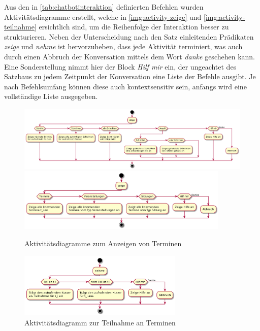 Aus den in \autoref{tab:chatbotinteraktion} definierten Befehlen wurden Aktivitätsdiagramme erstellt, welche in \autoref{img:activity-zeige} und \autoref{img:activity-teilnahme} ersichtlich sind, um die Reihenfolge der Interaktion besser zu strukturieren.
Neben der Unterscheidung nach den Satz einleitenden Prädikaten \textit{zeige} und \textit{nehme} ist hervorzuheben, dass jede Aktivität terminiert, was auch durch einen Abbruch der Konversation mittels dem Wort \textit{danke} geschehen kann. Eine Sonderstellung nimmt hier der Block \textit{Hilf mir} ein, der ungeachtet des Satzbaus zu jedem Zeitpunkt der Konversation eine Liste der Befehle ausgibt. Je nach Befehlsumfang können diese auch kontextsensitiv sein, anfangs wird eine vollständige Liste ausgegeben.

\begin{figure}[htbp]
    \centering
    \includegraphics[width=\textwidth]{../docs/uml/activity-zeige.png}
    \includegraphics[width=0.9\textwidth]{../docs/uml/activity-zeige2.png}
    \caption{Aktivitätsdiagramme zum Anzeigen von Terminen}
    \label{img:activity-zeige}
\end{figure}

\begin{figure}[htbp]
    \centering
    \includegraphics[width=0.7\textwidth]{../docs/uml/activity-teilnahme.png}
    \caption{Aktivitätsdiagramm zur Teilnahme an Terminen}
    \label{img:activity-teilnahme}
\end{figure}


